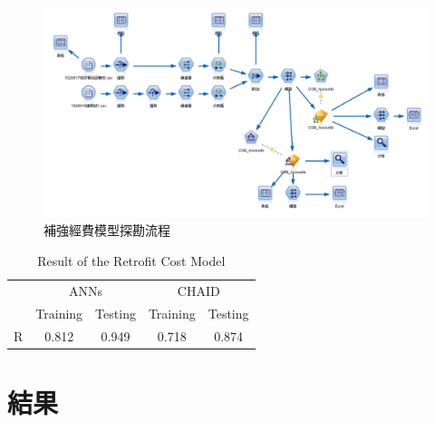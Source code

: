 \begin{figure}[hbtp]
  \begin{center}
    \includegraphics[width=1.0\textwidth]{figures/cob-flow.png}
    \caption{補強經費模型探勘流程} 
    \label{fig:cob-flow}
  \end{center}
\end{figure}



\begin{table}[hbtp]
  \begin{center}
    \caption{Result of the Retrofit Cost Model}
    \label{tab:cost_result}
    \large
    \begin{tabular}{l c c c c}
      \hline
       & \multicolumn{2}{c}{ANNs} & \multicolumn{2}{c}{CHAID} \\
       & Training & Testing & Training & Testing \\
      \hline
	   R & 0.812 & 0.949 & 0.718 & 0.874 \\
      \hline
      \end{tabular}
  \end{center}
\end{table}

\section{結果}

